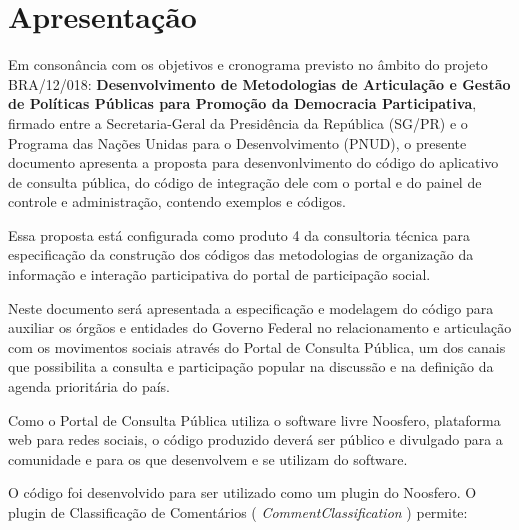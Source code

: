\documentclass[11pt]{article}
\begin{document}
\lstset{language=Ruby}


\clearpage

\clearpage

\tableofcontents
\clearpage
\listoffigures

\clearpage

\section{Apresentação}

Em consonância com os objetivos e cronograma previsto no âmbito do
projeto BRA/12/018:
\textbf{Desenvolvimento de Metodologias de Articulação e Gestão de
Políticas Públicas para Promoção da Democracia Participativa},
firmado entre a Secretaria-Geral da Presidência da República
(SG/PR) e o Programa das Nações Unidas para o Desenvolvimento (PNUD),
o presente documento apresenta a proposta para
desenvonlvimento do código do aplicativo de consulta pública, do código
de integração dele com o portal e do painel de controle e
administração, contendo exemplos e códigos.

Essa proposta está configurada como produto 4 da consultoria técnica
para especificação da construção dos códigos das metodologias de
organização da informação e interação participativa do portal de
participação social.

Neste documento será apresentada a especificação e
modelagem do código para auxiliar os órgãos e entidades do
Governo Federal no relacionamento e articulação com os movimentos
sociais através do Portal de Consulta Pública, um dos canais que
possibilita a consulta e participação popular na discussão e na definição
da agenda prioritária do país.

Como o Portal de Consulta Pública utiliza o software livre Noosfero,
plataforma web para redes sociais, o código produzido deverá ser público
e divulgado para a comunidade e para os que desenvolvem e se utilizam do
software.

O código foi desenvolvido para ser utilizado como um plugin do Noosfero.
O plugin de Classificação de Comentários ( {\it CommentClassification} )
permite:
\end{document}
